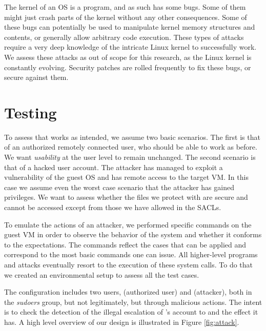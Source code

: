 \par The kernel of an \ac{OS} is a program, and as such has some bugs. Some of them might just crash parts of the kernel without any other consequences. Some of these bugs can potentially be used to manipulate kernel memory structures and contents, or generally allow arbitrary code execution. These types of attacks require a very deep knowledge of the intricate Linux kernel to successfully work. We assess these attacks as out of scope for this research, as the Linux kernel is constantly evolving. Security patches are rolled frequently to fix these bugs, or secure against them.

\section{Testing}\label{sec:testing}

\par To assess that  works as intended, we assume two basic scenarios. The first is that of an authorized remotely connected user, who should be able to work as before. We want \emph{usability} at the user level to remain unchanged. The second scenario is that of a hacked user account. The attacker has managed to exploit a vulnerability of the guest \ac{OS} and has remote access to the target \ac{VM}. In this case we assume even the worst case scenario that the attacker has gained  privileges. We want to assess whether the files we protect with  are secure and cannot be accessed except from those we have allowed in the \acp{SACL}.

\par To emulate the actions of an attacker, we performed specific commands on the guest \ac{VM} in order to observe the behavior of the system and whether it conforms to the expectations. The commands reflect the cases that  can be applied and correspond to the most basic commands one can issue. All higher-level programs and attacks eventually resort to the execution of these system calls. To do that we created an environmental setup to assess all the test cases. 

\par The configuration includes two users,  (authorized user) and  (attacker), both in the \emph{sudoers} group, but  not legitimately, but through malicious actions. The intent is to check the detection of the illegal escalation of 's account to  and the effect it has. A high level overview of our design is illustrated in Figure \ref{fig:attack}. 

